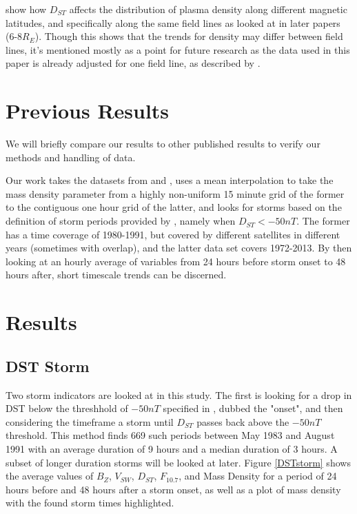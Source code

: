 \documentclass[10pt,twocolumn]{article}
\begin{document}
\cite{Denton2006} show how $D_{ST}$ affects the distribution of plasma density along different magnetic latitudes, and specifically along the same field lines as looked at in later papers (6-8$R_E$). Though this shows that the trends for density may differ between field lines, it's mentioned mostly as a point for future research as the data used in this paper is already adjusted for one field line, as described by \cite{Takahashi2010}.

\section{Previous Results}
We will briefly compare our results to other published results to verify our methods and handling of data. 

Our work takes the datasets from \cite{Denton} and \cite{Reconstruction}, uses a mean interpolation to take the mass density parameter from a highly non-uniform 15 minute grid of the former to the contiguous one hour grid of the latter, and looks for storms based on the definition of storm periods provided by \cite{Takahashi2010}, namely when $D_{ST}<-50nT$. The former has a time coverage of 1980-1991, but covered by different satellites in different years (sometimes with overlap), and the latter data set covers 1972-2013. By then looking at an hourly average of variables from 24 hours before storm onset to 48 hours after, short timescale trends can be discerned. 

\section{Results}


\subsection{DST Storm}
Two storm indicators are looked at in this study. The first is looking for a drop in DST below the threshhold of $-50nT$ specified in \cite{Takahashi2010}, dubbed the "onset", and then considering the timeframe a storm until $D_{ST}$ passes back above the $-50nT$ threshold. This method finds 669 such periods between May 1983 and August 1991 with an average duration of 9 hours and a median duration of 3 hours. A subset of longer duration storms will be looked at later. Figure \ref{DSTstorm} shows the average values of $B_Z$, $V_{SW}$, $D_{ST}$, $F_{10.7}$, and Mass Density for a period of 24 hours before and 48 hours after a storm onset, as well as a plot of mass density with the found storm times highlighted.
\end{document}
